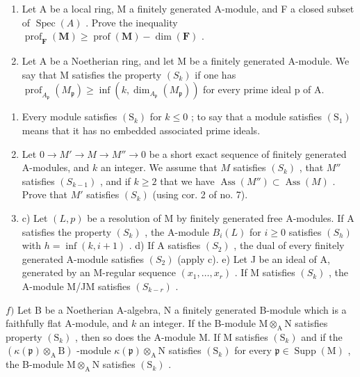 \begin{enumerate}
\item
  Let A be a local ring, M a finitely generated A-module, and F a closed subset of \(\operatorname{Spec}(A)\) . Prove the inequality \(\operatorname{prof}_{\mathbf{F}}(\mathbf{M}) \geqslant \operatorname{prof}(\mathbf{M}) - \dim(\mathbf{F})\) .
\item
  Let A be a Noetherian ring, and let M be a finitely generated A-module. We say that M satisfies the property \((S_{k})\) if one has \(\operatorname{prof}_{A_{\mathfrak{p}}}(M_{\mathfrak{p}}) \geqslant \inf(k, \dim_{A_{\mathfrak{p}}}(M_{\mathfrak{p}}))\) for every prime ideal p of A.
\end{enumerate}

\begin{enumerate}
\def\labelenumi{\alph{enumi})}
\item
  Every module satisfies \((\mathrm{S}_{k})\) for \(k \leqslant 0\) ; to say that a module satisfies \((\mathrm{S}_{1})\) means that it has no embedded associated prime ideals.
\item
  Let \(0 \to M' \to M \to M'' \to 0\) be a short exact sequence of finitely generated A-modules, and \(k\) an integer. We assume that \(M\) satisfies \((S_k)\) , that \(M''\) satisfies \((S_{k-1})\) , and if \(k \geqslant 2\) that we have \(\operatorname{Ass}(M'') \subset \operatorname{Ass}(M)\) . Prove that \(M'\) satisfies \((S_k)\) (using cor. 2 of no. 7).
\item
  c) Let \((L,p)\) be a resolution of M by finitely generated free A-modules. If A satisfies the property \((S_{k})\) , the A-module \(B_{i}(L)\) for \(i \geqslant 0\) satisfies \((S_{h})\) with \(h = \inf(k,i+1)\) . d) If A satisfies \((S_{2})\) , the dual of every finitely generated A-module satisfies \((S_{2})\) (apply c). e) Let J be an ideal of A, generated by an M-regular sequence \((x_{1},\ldots,x_{r})\) . If M satisfies \((S_{k})\) , the A-module M/JM satisfies \((S_{k-r})\) .
\end{enumerate}

\(f)\) Let B be a Noetherian A-algebra, N a finitely generated B-module which is a faithfully flat A-module, and \(k\) an integer. If the B-module \(\mathrm{M} \otimes_{\mathrm{A}} \mathrm{N}\) satisfies property \((\mathrm{S}_k)\) , then so does the A-module M. If M satisfies \((\mathrm{S}_k)\) and if the \((\kappa(\mathfrak{p}) \otimes_{\mathrm{A}} \mathrm{B})\) -module \(\kappa(\mathfrak{p}) \otimes_{\mathrm{A}} \mathrm{N}\) satisfies \((\mathrm{S}_k)\) for every \(\mathfrak{p} \in \operatorname{Supp}(\mathrm{M})\) , the B-module \(\mathrm{M} \otimes_{\mathrm{A}} \mathrm{N}\) satisfies \((\mathrm{S}_k)\) .

